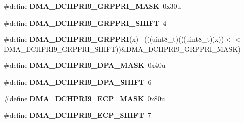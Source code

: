 \begin{DoxyCompactItemize}
\item 
\hypertarget{group___d_m_a___register___masks_ga955c86f3c3426195fd3a51eb4d2b2ff0}{}\#define {\bfseries D\+M\+A\+\_\+\+D\+C\+H\+P\+R\+I9\+\_\+\+G\+R\+P\+P\+R\+I\+\_\+\+M\+A\+S\+K}~0x30u\label{group___d_m_a___register___masks_ga955c86f3c3426195fd3a51eb4d2b2ff0}

\item 
\hypertarget{group___d_m_a___register___masks_gaef495d5bd0330e55726a563f62ed7088}{}\#define {\bfseries D\+M\+A\+\_\+\+D\+C\+H\+P\+R\+I9\+\_\+\+G\+R\+P\+P\+R\+I\+\_\+\+S\+H\+I\+F\+T}~4\label{group___d_m_a___register___masks_gaef495d5bd0330e55726a563f62ed7088}

\item 
\hypertarget{group___d_m_a___register___masks_gabd3a28806666151b8da9021f5ac8ec51}{}\#define {\bfseries D\+M\+A\+\_\+\+D\+C\+H\+P\+R\+I9\+\_\+\+G\+R\+P\+P\+R\+I}(x)                                    ~(((uint8\+\_\+t)(((uint8\+\_\+t)(x))$<$$<$D\+M\+A\+\_\+\+D\+C\+H\+P\+R\+I9\+\_\+\+G\+R\+P\+P\+R\+I\+\_\+\+S\+H\+I\+F\+T))\&D\+M\+A\+\_\+\+D\+C\+H\+P\+R\+I9\+\_\+\+G\+R\+P\+P\+R\+I\+\_\+\+M\+A\+S\+K)\label{group___d_m_a___register___masks_gabd3a28806666151b8da9021f5ac8ec51}

\item 
\hypertarget{group___d_m_a___register___masks_gaf6b71f66ce2e3113012b094e339c2c97}{}\#define {\bfseries D\+M\+A\+\_\+\+D\+C\+H\+P\+R\+I9\+\_\+\+D\+P\+A\+\_\+\+M\+A\+S\+K}~0x40u\label{group___d_m_a___register___masks_gaf6b71f66ce2e3113012b094e339c2c97}

\item 
\hypertarget{group___d_m_a___register___masks_ga369577ef8e1c3d9eb3756e1a37abe070}{}\#define {\bfseries D\+M\+A\+\_\+\+D\+C\+H\+P\+R\+I9\+\_\+\+D\+P\+A\+\_\+\+S\+H\+I\+F\+T}~6\label{group___d_m_a___register___masks_ga369577ef8e1c3d9eb3756e1a37abe070}

\item 
\hypertarget{group___d_m_a___register___masks_gadc613e99a97309c8ca4526630226676a}{}\#define {\bfseries D\+M\+A\+\_\+\+D\+C\+H\+P\+R\+I9\+\_\+\+E\+C\+P\+\_\+\+M\+A\+S\+K}~0x80u\label{group___d_m_a___register___masks_gadc613e99a97309c8ca4526630226676a}

\item 
\hypertarget{group___d_m_a___register___masks_gafabc45696d405cdb5aa873607867d490}{}\#define {\bfseries D\+M\+A\+\_\+\+D\+C\+H\+P\+R\+I9\+\_\+\+E\+C\+P\+\_\+\+S\+H\+I\+F\+T}~7\label{group___d_m_a___register___masks_gafabc45696d405cdb5aa873607867d490}


\end{DoxyCompactItemize}

